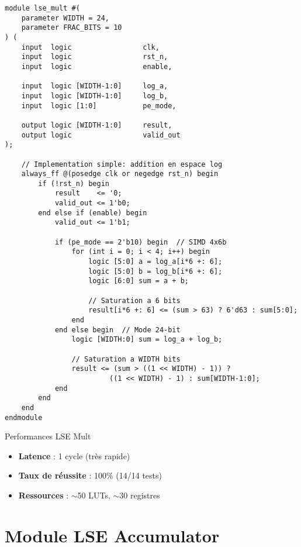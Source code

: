 \documentclass[12pt,a4paper]{article}
\begin{document}
\begin{lstlisting}[style=verilog, caption={Module lse\_mult.sv}]
module lse_mult #(
    parameter WIDTH = 24,
    parameter FRAC_BITS = 10
) (
    input  logic                 clk,
    input  logic                 rst_n,
    input  logic                 enable,
    
    input  logic [WIDTH-1:0]     log_a,
    input  logic [WIDTH-1:0]     log_b,
    input  logic [1:0]           pe_mode,
    
    output logic [WIDTH-1:0]     result,
    output logic                 valid_out
);

    // Implementation simple: addition en espace log
    always_ff @(posedge clk or negedge rst_n) begin
        if (!rst_n) begin
            result    <= '0;
            valid_out <= 1'b0;
        end else if (enable) begin
            valid_out <= 1'b1;
            
            if (pe_mode == 2'b10) begin  // SIMD 4x6b
                for (int i = 0; i < 4; i++) begin
                    logic [5:0] a = log_a[i*6 +: 6];
                    logic [5:0] b = log_b[i*6 +: 6];
                    logic [6:0] sum = a + b;
                    
                    // Saturation a 6 bits
                    result[i*6 +: 6] <= (sum > 63) ? 6'd63 : sum[5:0];
                end
            end else begin  // Mode 24-bit
                logic [WIDTH:0] sum = log_a + log_b;
                
                // Saturation a WIDTH bits
                result <= (sum > ((1 << WIDTH) - 1)) ? 
                         ((1 << WIDTH) - 1) : sum[WIDTH-1:0];
            end
        end
    end
endmodule
\end{lstlisting}

\begin{successbox}{Performances LSE Mult}
\begin{itemize}
    \item \textbf{Latence} : 1 cycle (très rapide)
    \item \textbf{Taux de réussite} : 100\% (14/14 tests)
    \item \textbf{Ressources} : $\sim$50 LUTs, $\sim$30 registres
\end{itemize}
\end{successbox}

\section{Module LSE Accumulator}
\end{document}
